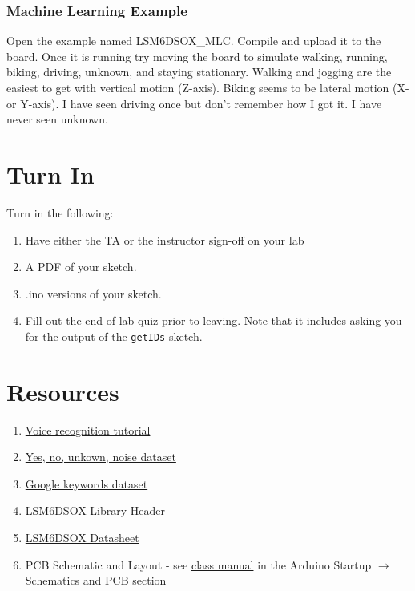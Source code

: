 \subsubsection{Machine Learning Example}
Open the example named LSM6DSOX\_MLC. Compile and upload it to the board. Once it is 
running try moving the board to simulate walking, running, biking, driving, unknown, and 
staying stationary. Walking and jogging are the easiest to get with vertical motion (Z-axis). 
Biking seems to be lateral motion (X- or Y-axis). I have seen driving once but don't remember 
how I got it. I have never seen unknown.



\section{Turn In}
Turn in the following:
\begin{enumerate}
    \item Have either the TA or the instructor sign-off on your lab
    \item A PDF of your sketch.
    \item .ino versions of your sketch.
    \item Fill out the end of lab quiz prior to leaving. Note that it includes asking you 
            for the output of the \lstinline$getIDs$ sketch. 
\end{enumerate}

\section{Resources}\label{sec:machinelearningresources}
\begin{enumerate}
    \item \href{https://pietropoluzzi.it/blog/ml/edge-impulse/voice-recognition/}{Voice recognition tutorial}
    \item \href{https://docs.edgeimpulse.com/docs/pre-built-datasets/keyword-spotting}{Yes, no, unkown, noise dataset}
    \item \href{https://blog.research.google/2017/08/launching-speech-commands-dataset.html}{Google keywords dataset}
    \item \href{https://github.com/stm32duino/LSM6DSOX/blob/main/src/LSM6DSOXSensor.h}{LSM6DSOX Library Header}
    \item \href{https://www.st.com/resource/en/datasheet/lsm6dsox.pdf}{LSM6DSOX Datasheet}
    \item PCB Schematic and Layout - see 
            \href{https://github.com/semcneil/Fundamentals-of-Microcontrollers-Manual}{class manual} 
            in the Arduino Startup $\rightarrow$ Schematics and PCB section
\end{enumerate}

